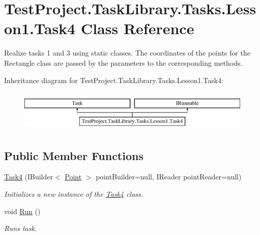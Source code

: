 \hypertarget{class_test_project_1_1_task_library_1_1_tasks_1_1_lesson1_1_1_task4}{}\section{Test\+Project.\+Task\+Library.\+Tasks.\+Lesson1.\+Task4 Class Reference}
\label{class_test_project_1_1_task_library_1_1_tasks_1_1_lesson1_1_1_task4}


Realize tasks 1 and 3 using static classes. The coordinates of the points for the Rectangle class are passed by the parameters to the corresponding methods.  


Inheritance diagram for Test\+Project.\+Task\+Library.\+Tasks.\+Lesson1.\+Task4\+:\begin{figure}[H]
\begin{center}
\leavevmode
\includegraphics[height=2.000000cm]{class_test_project_1_1_task_library_1_1_tasks_1_1_lesson1_1_1_task4}
\end{center}
\end{figure}
\subsection*{Public Member Functions}
\begin{DoxyCompactItemize}
\item 
\mbox{\hyperlink{class_test_project_1_1_task_library_1_1_tasks_1_1_lesson1_1_1_task4_aa5138429f4e2d9db2bc8f4d353d50cbd}{Task4}} (I\+Builder$<$ \mbox{\hyperlink{class_test_project_1_1_task_library_1_1_tasks_1_1_lesson1_1_1_models_1_1_point}{Point}} $>$ point\+Builder=null, I\+Reader point\+Reader=null)
\begin{DoxyCompactList}\small\item\em Initializes a new instance of the \mbox{\hyperlink{class_test_project_1_1_task_library_1_1_tasks_1_1_lesson1_1_1_task4}{Task4}} class. \end{DoxyCompactList}\item 
void \mbox{\hyperlink{class_test_project_1_1_task_library_1_1_tasks_1_1_lesson1_1_1_task4_aa1ace3f933caae7f76c9eaf44536ea16}{Run}} ()
\begin{DoxyCompactList}\small\item\em Runs task. \end{DoxyCompactList}\end{DoxyCompactItemize}


